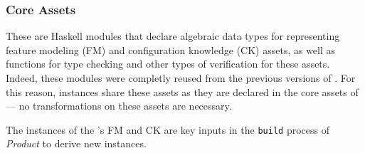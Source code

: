 




\subsubsection{Core Assets} \label{core-assets}

These are Haskell modules that declare algebraic data types for representing feature modeling (FM) and configuration knowledge (CK) assets, as well as functions for type checking and other types of verification for these assets. Indeed, these modules were completly reused from the previous versions of \hp. For this reason, \hpl{} instances share these assets as they are declared in the core assets of \hpl--- no transformations on these assets are necessary.

The instances of the \hpl{}'s FM and CK are key inputs in the \texttt{build} process of \textit{\hp{} Product} to derive new \hpl{} instances.

